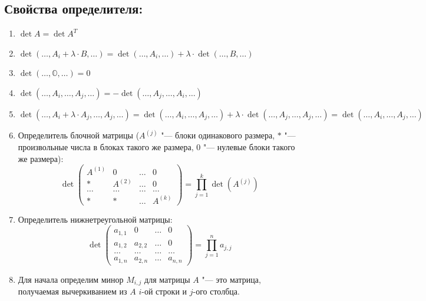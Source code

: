 \documentclass{article}
\begin{document}
\subsection{Свойства определителя:}
\begin{enumerate}
	\item $\operatorname{det}A = \operatorname{det}A^T$
	\item $\operatorname{det}(\ldots, A_i+\lambda\cdot B,\ldots) = \operatorname{det}(\ldots, A_i, \ldots) + \lambda\cdot \operatorname{det}(\ldots, B, \ldots)$
	\item $\operatorname{det}(\ldots, \mathbb{O}, \ldots) = 0$
	\item $\operatorname{det}(\ldots, A_i, \ldots, A_j, \ldots) = -\operatorname{det}(\ldots, A_j, \ldots, A_i, \ldots)$
	\item $\operatorname{det}(\ldots, A_i + \lambda\cdot A_j, \ldots, A_j, \ldots) = \operatorname{det}(\ldots, A_i, \ldots, A_j, \ldots) + \lambda\cdot\operatorname{det}(\ldots, A_j, \ldots, A_j, \ldots) = \operatorname{det}(\ldots, A_i, \ldots, A_j, \ldots)$
	\item Определитель блочной матрицы ($A^{(j)}$ "--- блоки одинакового размера, $*$ "--- произвольные числа в блоках такого же размера, $0$ "--- нулевые блоки такого же размера):
	\begin{equation*}\operatorname{det}
	\begin{pmatrix}
	A^{(1)}& 0& \ldots&0\\
	* & A^{(2)} & \ldots & 0\\
	\ldots & \ldots & \ldots & \ldots\\
	* & * & \ldots & A^{(k)}  
	\end{pmatrix} = \prod_{j = 1}^k \operatorname{det}(A^{(j)})
	\end{equation*}
	\item Определитель нижнетреугольной матрицы:
	\begin{equation*}\operatorname{det}
	\begin{pmatrix}
	a_{1, 1} & 0 & \ldots & 0\\
	a_{1, 2} & a_{2, 2} & \ldots & 0\\
	\ldots &\ldots &\ldots& \ldots\\
	a_{1, n} & a_{2, n} & \ldots & a_{n, n}
	\end{pmatrix} = \prod_{j = 1}^{n} a_{j, j}
	\end{equation*}
	\item Для начала определим минор $M_{i, j}$ для матрицы $A$ "--- это матрица, получаемая вычеркиванием из $A$ $i$-ой строки и $j$-ого столбца.

\end{enumerate}
\end{document}
